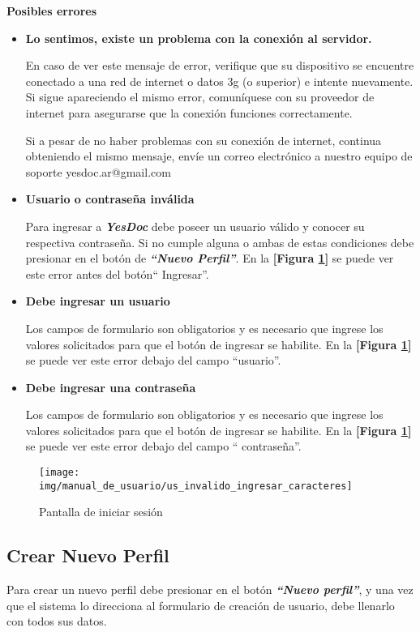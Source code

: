 \textbf{Posibles errores}
\begin{itemize}
	\item \textbf{Lo sentimos, existe un problema con la conexión al servidor.}
	
	En caso de ver este mensaje de error, verifique que su dispositivo se encuentre conectado a una red de internet o datos 3g (o superior) e intente nuevamente. Si sigue apareciendo el mismo error, comuníquese con su proveedor de internet para asegurarse que la conexión funciones correctamente.
	
	Si a pesar de no haber problemas con su conexión de internet, continua obteniendo el mismo mensaje, envíe un correo electrónico a nuestro equipo de soporte yesdoc.ar@gmail.com
	
	\item \textbf{Usuario o contraseña inválida}
	
	Para ingresar a \textbf{\textit{YesDoc}} debe poseer un usuario válido y conocer su respectiva contraseña. Si no cumple alguna o ambas de estas condiciones debe presionar en el botón de \textbf{\textit{``Nuevo Perfil''}}. En la \textbf{[Figura \ref{mu-us_invalido_ingresar_caracteres}]} se puede ver este error antes del botón`` Ingresar''.
	
	\item \textbf{Debe ingresar un usuario}
	
	Los campos de formulario son obligatorios y es necesario que ingrese los valores solicitados para que el botón de ingresar se habilite. En la \textbf{[Figura \ref{mu-us_invalido_ingresar_caracteres}]} se puede ver este error debajo del campo ``usuario''.
	
	\item \textbf{Debe ingresar una contraseña}
	
	Los campos de formulario son obligatorios y es necesario que ingrese los valores solicitados para que el botón de ingresar se habilite.	 En la \textbf{[Figura \ref{mu-us_invalido_ingresar_caracteres}]} se puede ver este error debajo del campo `` contraseña''.
\end{itemize}
 \begin{figure}
 	\centering
 	\texttt{[image: img/manual\_de\_usuario/us\_invalido\_ingresar\_caracteres]}
 	\caption{Pantalla de iniciar sesión}
 	\label{mu-us_invalido_ingresar_caracteres}
 \end{figure}

\subsection{Crear Nuevo Perfil}
Para crear un nuevo perfil debe presionar en el botón \textbf{\textit{``Nuevo perfil''}}, y una vez que el sistema lo direcciona al formulario de creación de usuario, debe llenarlo con todos sus datos.

